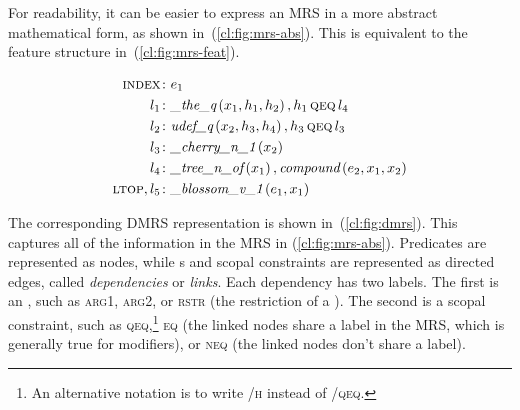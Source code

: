 \documentclass[output=paper
 	        ,biblatex
                ,babelshorthands
                ,newtxmath
                ,draftmode
                ,colorlinks, citecolor=brown
]{langscibook}
\begin{document}
\noindent
For readability, it can be easier to express an MRS
in a more abstract mathematical form, as shown in~(\ref{cl:fig:mrs-abs}).
This is equivalent to the feature structure in~(\ref{cl:fig:mrs-feat}).

\begin{exe}
	\setlength{\abovedisplayskip}{1ex}
	\setlength{\belowdisplayskip}{1ex}
	\ex\label{cl:fig:mrs-abs}
	\begin{minipage}[c]{.6\textwidth}
	\vspace*{-1\baselineskip}
	\begin{align*}
	    \textsc{index}\colon & e_1 \\
		l_1\colon & \textit{\_the\_q}\left(x_1,h_1,h_2\right), h_1 \,\textsc{qeq}\, l_4 \\
		l_2\colon & \textit{udef\_q}\left(x_2,h_3,h_4\right), h_3 \,\textsc{qeq}\, l_3 \\
		l_3\colon & \textit{\_cherry\_n\_1}\left(x_2\right) \\
		l_4\colon & \textit{\_tree\_n\_of}\left(x_1\right), \textit{compound}\left(e_2,x_1,x_2\right) \\
		\textsc{ltop}, l_5\colon & \textit{\_blossom\_v\_1}\left(e_1,x_1\right)
	\end{align*}
	\end{minipage}
\end{exe}

The corresponding DMRS
representation is shown in~(\ref{cl:fig:dmrs}).
This captures all of the information
in the MRS in (\ref{cl:fig:mrs-abs}).
Predicates are represented as nodes,
while s and scopal constraints are represented as directed edges,
called \textit{dependencies} or \textit{links}.
Each dependency has two labels.
The first is an ,
such as \textsc{arg1}, \textsc{arg2},
or \textsc{rstr} (the restriction of a ).
The second is a scopal constraint,
such as \textsc{qeq},\footnote{%
	An alternative notation is to write
	\textsc{/h} instead of \textsc{/qeq}.
}
\textsc{eq} (the linked nodes share a label in the MRS,
which is generally true for modifiers),
or \textsc{neq} (the linked nodes don't share a label).
\end{document}
